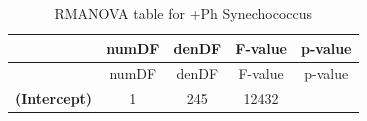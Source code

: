 \documentclass[]{article}
\begin{document}
\begin{longtable}[]{@{}ccccc@{}}
\caption{RMANOVA table for +Ph Synechococcus}\tabularnewline
\toprule
\begin{minipage}[b]{0.21\columnwidth}\centering\strut
~
\strut\end{minipage} &
\begin{minipage}[b]{0.10\columnwidth}\centering\strut
numDF
\strut\end{minipage} &
\begin{minipage}[b]{0.10\columnwidth}\centering\strut
denDF
\strut\end{minipage} &
\begin{minipage}[b]{0.12\columnwidth}\centering\strut
F-value
\strut\end{minipage} &
\begin{minipage}[b]{0.12\columnwidth}\centering\strut
p-value
\strut\end{minipage}\tabularnewline
\midrule
\endfirsthead
\toprule
\begin{minipage}[b]{0.21\columnwidth}\centering\strut
~
\strut\end{minipage} &
\begin{minipage}[b]{0.10\columnwidth}\centering\strut
numDF
\strut\end{minipage} &
\begin{minipage}[b]{0.10\columnwidth}\centering\strut
denDF
\strut\end{minipage} &
\begin{minipage}[b]{0.12\columnwidth}\centering\strut
F-value
\strut\end{minipage} &
\begin{minipage}[b]{0.12\columnwidth}\centering\strut
p-value
\strut\end{minipage}\tabularnewline
\midrule
\endhead
\begin{minipage}[t]{0.21\columnwidth}\centering\strut
\textbf{(Intercept)}
\strut\end{minipage} &
\begin{minipage}[t]{0.10\columnwidth}\centering\strut
1
\strut\end{minipage} &
\begin{minipage}[t]{0.10\columnwidth}\centering\strut
245
\strut\end{minipage} &
\begin{minipage}[t]{0.12\columnwidth}\centering\strut
12432
\strut\end{minipage} &
\begin{minipage}[t]{0.12\columnwidth}\centering\strut

\end{minipage}
\end{longtable}
\end{document}
